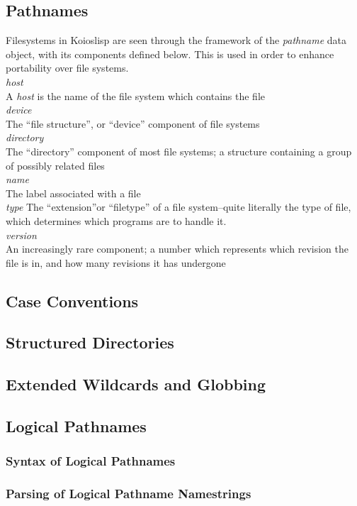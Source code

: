 \documentclass[10pt]{book}
\begin{document}
\subsection{Pathnames}
Filesystems in Koioslisp are seen through the framework of the \textit{pathname} data object, with its components defined below.  This is used in order to enhance portability over file systems.\\
\textit{host}\\
A \textit{host} is the name of the file system which contains the file\\
\textit{device}\\
The ``file structure'', or ``device'' component of file systems\\
\textit{directory}\\
The ``directory'' component of most file systems; a structure containing a group of possibly related files\\
\textit{name}\\
The label associated with a file\\
\textit{type}
The ``extension''or ``filetype'' of a file system--quite literally the type of file, which determines which programs are to handle it.\\
\textit{version}\\
An increasingly rare component; a number which represents which revision the file is in, and how many revisions it has undergone\\
\subsection{Case Conventions}
\subsection{Structured Directories}
\subsection{Extended Wildcards and Globbing}
\subsection{Logical Pathnames}
\subsubsection{Syntax of Logical Pathnames}
\subsubsection{Parsing of Logical Pathname Namestrings}
\end{document}
